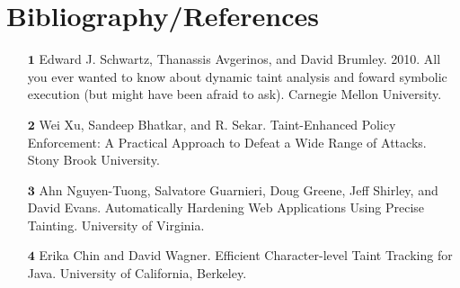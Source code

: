 \documentclass[11pt]{article}
\begin{document}
\newpage
\section*{Bibliography/References}
\begin{enumerate}
    \item[$\textbf{1}$] Edward J. Schwartz, Thanassis Avgerinos, and David Brumley. 
        2010. All you ever wanted to know about dynamic taint analysis and foward 
        symbolic execution (but might have been afraid to ask). Carnegie Mellon 
        University.

    \item[$\textbf{2}$] Wei Xu, Sandeep Bhatkar, and R. Sekar. Taint-Enhanced Policy
        Enforcement: A Practical Approach to Defeat a Wide Range of Attacks.
        Stony Brook University.

    \item[$\textbf{3}$] Ahn Nguyen-Tuong, Salvatore Guarnieri, Doug Greene, Jeff
        Shirley, and David Evans. Automatically Hardening Web Applications Using 
        Precise Tainting. University of Virginia.

    \item[$\textbf{4}$] Erika Chin and David Wagner. Efficient Character-level 
        Taint Tracking for Java. University of California, Berkeley.

\end{enumerate}
\end{document}
